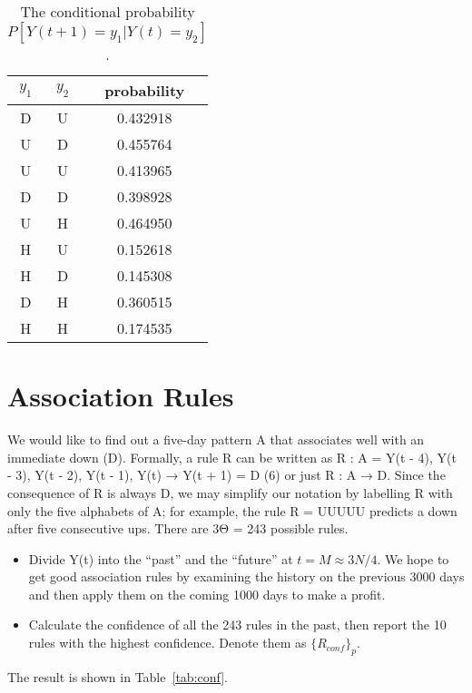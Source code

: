 \documentclass[runningheads]{llncs}
\begin{document}
\begin{table}
    \centering
    \caption{The conditional probability $P[Y(t+1)=y_1|Y(t)=y_2]$.}
    \label{tab:p12}
    \begin{tabularx}{\textwidth}{|C|C|C|}
        \hline
        $y_1$ & $y_2$ & probability \\
        \hline
        D     & U     & 0.432918    \\
        U     & D     & 0.455764    \\
        U     & U     & 0.413965    \\
        D     & D     & 0.398928    \\
        U     & H     & 0.464950    \\
        H     & U     & 0.152618    \\
        H     & D     & 0.145308    \\
        D     & H     & 0.360515    \\
        H     & H     & 0.174535    \\
        \hline
    \end{tabularx}
\end{table}

\section{Association Rules}
We would like to find out a five-day pattern A that associates well with an
immediate down (D). Formally, a rule R can be written as
R : A = {Y(t - 4), Y(t - 3), Y(t - 2), Y(t - 1), Y(t)} → Y(t + 1) = D (6)
or just R : A → D. Since the consequence of R is always D, we may simplify
our notation by labelling R with only the five alphabets of A; for example, the
rule R = UUUUU predicts a down after five consecutive ups. There are 3Θ =
243 possible rules.
\begin{itemize}
    \item Divide Y(t) into the “past” and the “future” at $t = M ≈ 3N /4$. We hope to
          get good association rules by examining the history on the previous 3000
          days and then apply them on the coming 1000 days to make a profit.
    \item Calculate the confidence of all the 243 rules in the past, then report the 10
          rules with the highest confidence. Denote them as $\{R_{conf}\}_p$.
\end{itemize}

The result is shown in Table~\ref{tab:conf}.
\end{document}
